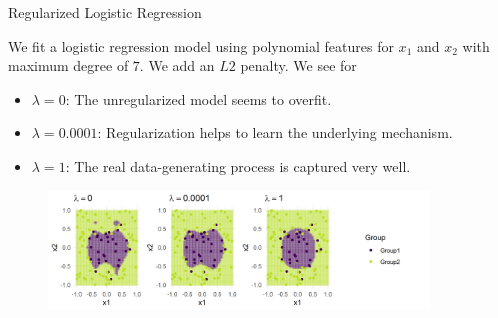 \documentclass[11pt,compress,t,notes=noshow, xcolor=table]{beamer}
\begin{document}
\begin{vbframe}{Regularized Logistic Regression}


We fit a logistic regression model using polynomial features for \(x_1\)
and \(x_2\) with maximum degree of \(7\). We add an $L2$ penalty. We
see for

\begin{itemize}

\item
  \(\lambda = 0\): The unregularized model seems to overfit.
\item
  \(\lambda = 0.0001\): Regularization helps to learn the underlying
  mechanism.
\item
  \(\lambda = 1\): The real data-generating process is captured very well.
\end{itemize}

\scriptsize

\begin{figure}
\includegraphics[width=0.9\textwidth]{figure/reg_logreg.png}\\
\end{figure}


\normalsize 

\end{vbframe}


\endlecture
\end{document}
